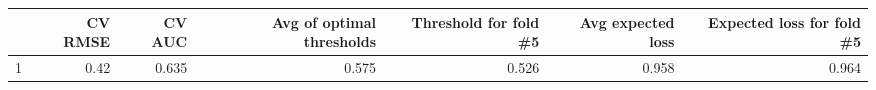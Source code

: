 
\begin{tabular}{lrrrrrr}
\toprule
  & CV RMSE & CV AUC & Avg of optimal thresholds & Threshold for fold \#5 & Avg expected loss & Expected loss for fold \#5\\
\midrule
1 & 0.42 & 0.635 & 0.575 & 0.526 & 0.958 & 0.964\\
\bottomrule
\end{tabular}